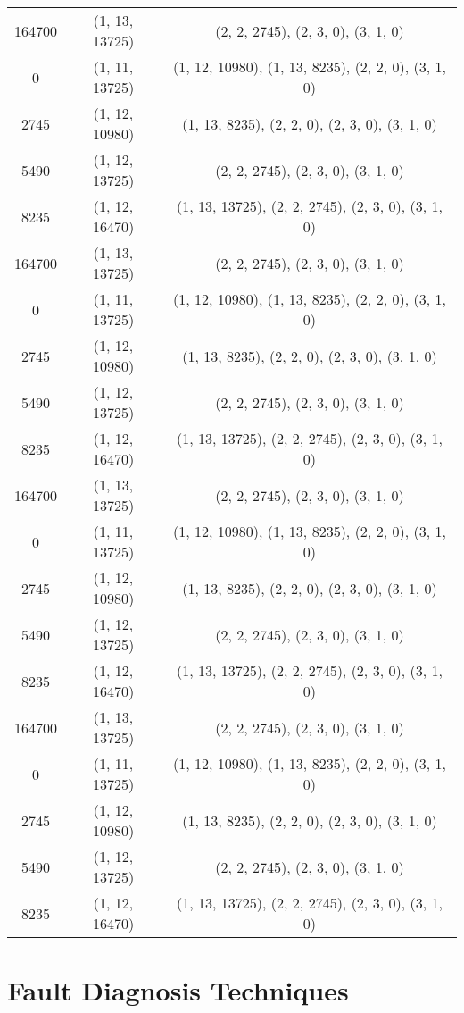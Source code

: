 \begin{center}
\begin{longtable}{ccc}
		164700 & (1, 13, 13725) & (2, 2, 2745), (2, 3, 0), (3, 1, 0) \\
		0      & (1, 11, 13725) & (1, 12, 10980), (1, 13, 8235), (2, 2, 0), (3, 1, 0) \\
		2745   & (1, 12, 10980) & (1, 13, 8235), (2, 2, 0), (2, 3, 0), (3, 1, 0) \\
		5490   & (1, 12, 13725) & (2, 2, 2745), (2, 3, 0), (3, 1, 0) \\
		8235   & (1, 12, 16470) & (1, 13, 13725), (2, 2, 2745), (2, 3, 0), (3, 1, 0) \\
		164700 & (1, 13, 13725) & (2, 2, 2745), (2, 3, 0), (3, 1, 0) \\
		0      & (1, 11, 13725) & (1, 12, 10980), (1, 13, 8235), (2, 2, 0), (3, 1, 0) \\
		2745   & (1, 12, 10980) & (1, 13, 8235), (2, 2, 0), (2, 3, 0), (3, 1, 0) \\
		5490   & (1, 12, 13725) & (2, 2, 2745), (2, 3, 0), (3, 1, 0) \\
		8235   & (1, 12, 16470) & (1, 13, 13725), (2, 2, 2745), (2, 3, 0), (3, 1, 0) \\
		164700 & (1, 13, 13725) & (2, 2, 2745), (2, 3, 0), (3, 1, 0) \\
		0      & (1, 11, 13725) & (1, 12, 10980), (1, 13, 8235), (2, 2, 0), (3, 1, 0) \\
		2745   & (1, 12, 10980) & (1, 13, 8235), (2, 2, 0), (2, 3, 0), (3, 1, 0) \\
		5490   & (1, 12, 13725) & (2, 2, 2745), (2, 3, 0), (3, 1, 0) \\
		8235   & (1, 12, 16470) & (1, 13, 13725), (2, 2, 2745), (2, 3, 0), (3, 1, 0) \\
		164700 & (1, 13, 13725) & (2, 2, 2745), (2, 3, 0), (3, 1, 0) \\
		0      & (1, 11, 13725) & (1, 12, 10980), (1, 13, 8235), (2, 2, 0), (3, 1, 0) \\
		2745   & (1, 12, 10980) & (1, 13, 8235), (2, 2, 0), (2, 3, 0), (3, 1, 0) \\
		5490   & (1, 12, 13725) & (2, 2, 2745), (2, 3, 0), (3, 1, 0) \\
		8235   & (1, 12, 16470) & (1, 13, 13725), (2, 2, 2745), (2, 3, 0), (3, 1, 0) \\
	\end{longtable}

\section{Fault Diagnosis Techniques}


\end{center}
